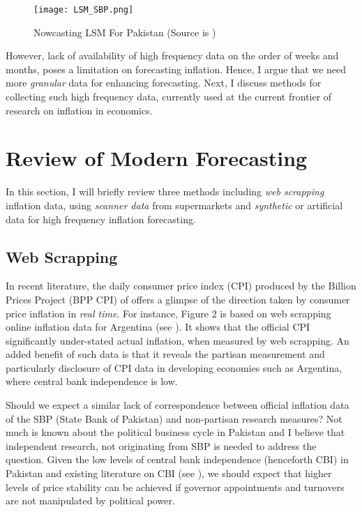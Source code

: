 \documentclass[12pt]{article}
\newcommand{\1}{\mathbbm 1}
\begin{document}
		
		\begin{figure}[H]
			\begin{Center}
				\texttt{[image: LSM\_SBP.png]}
				\caption{Nowcasting LSM For Pakistan (Source is \cite{hussain2018nowcasting})}
			\end{Center}
		\end{figure}
		
		
		However, lack of availability of high frequency data on the order of weeks and months, poses a limitation on forecasting inflation. Hence, I argue that we need more \textit{granular} data for enhancing forecasting. Next, I discuss methods for collecting such high frequency data, currently used at the current frontier of research on inflation in economics.
		
		
		
		
		
		
		
		
		\section{Review of Modern Forecasting}
		
		In this section, I will briefly review three methods including \textit{web scrapping} inflation data, using \textit{scanner data} from supermarkets and \textit{synthetic} or artificial data for high frequency inflation forecasting. 
		
		\subsection{Web Scrapping}
		
		
		In recent literature, the daily consumer price index (CPI) produced by the Billion Prices Project (BPP CPI) of \cite{cavallo2016billion} offers a glimpse of the direction taken by consumer price inflation in \textit{real time}. For instance, Figure 2 is based on web scrapping online inflation data for Argentina (see \cite{cavallo2016billion}). It shows that the official CPI significantly under-stated actual inflation, when measured by web scrapping. An added benefit of such data is that it reveals the partisan measurement and particularly disclosure of CPI data in developing economies such as Argentina, where central bank independence is low. 
		
		Should we expect a similar lack of correspondence between official inflation data of the SBP (State Bank of Pakistan) and non-partisan research measures? Not much is known about the political business cycle in Pakistan and I believe that independent research, not originating from SBP is needed to address the question. Given the low levels of central bank independence (henceforth CBI) in Pakistan and existing literature on CBI (see \cite{vuletin2011replacing}), we should expect that higher levels of price stability can be achieved if governor appointments and turnovers are not manipulated by political power.
		
\end{document}
